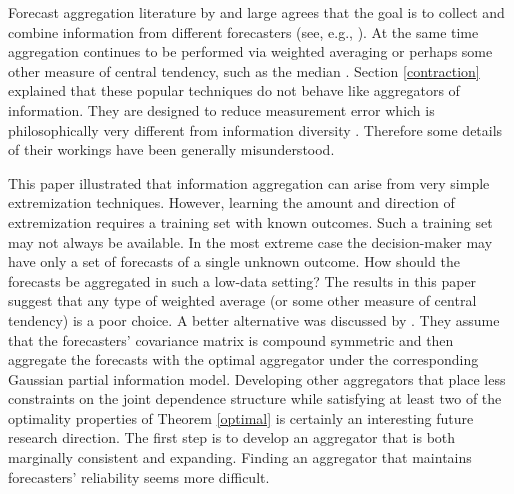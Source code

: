 \documentclass[11pt]{article}
\theoremstyle{definition}
\theoremstyle{definition}
\begin{document}
Forecast aggregation literature by and large agrees that the goal is to collect and combine  information from different forecasters (see, e.g., \citealt{forlines2012heuristics, armstrong2, dawid1995coherent}). At the same time aggregation continues to be performed via weighted averaging or perhaps some other measure of central tendency, such as the median \citep{armstrong2, levins1966strategy, lobo2010human}. Section \ref{contraction} explained that these popular techniques do not behave like aggregators of information. They are designed to reduce measurement error which is philosophically very different from information diversity \citep{satopaamodeling2}. Therefore some details of their workings have been generally misunderstood.

This paper illustrated that information aggregation can arise from very simple extremization techniques. However, learning the amount and direction of extremization requires a training set with known outcomes. Such a training set may not always be available. In the most extreme case  the decision-maker may have only a set of forecasts of a single unknown outcome. How should the forecasts be aggregated in such a low-data setting? The results in this paper suggest that any type of weighted average (or some other measure of central tendency) is a poor choice. A better alternative was discussed by \cite{satopaamodeling}. They assume that the forecasters' covariance matrix is compound symmetric and then aggregate the forecasts with the optimal aggregator under the corresponding Gaussian partial information model. 
 Developing other aggregators that place less constraints on the joint dependence structure while satisfying at least two of the optimality properties of Theorem \ref{optimal} is certainly an interesting future research direction. The first step is to develop an aggregator that is both marginally consistent and expanding. Finding an aggregator that maintains forecasters' reliability seems more difficult. 
\end{document}
